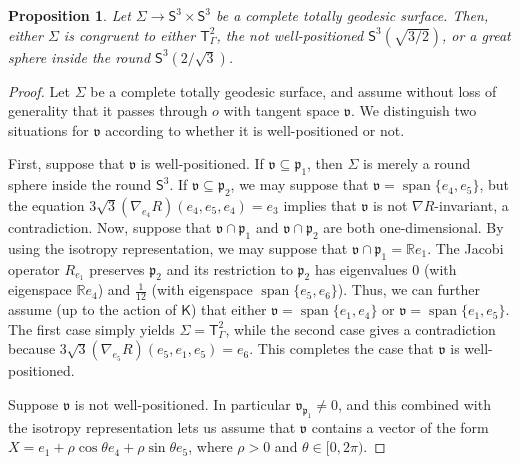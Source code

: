 \documentclass[11pt,a4paper,final]{amsart}
\newcommand{\s}{\mathsf}
\newcommand{\g}{\mathfrak}
\newcommand{\R}{\mathbb{R}}
\newcommand{\vecspan}{\operatorname{span}}
\newtheorem{proposition}[theorem]{Proposition}
\theoremstyle{definition}
\begin{document}
\begin{proposition}
	\label{prop:2tgs3s3}
	Let $\Sigma\to \mathsf{S}^{3}\times \mathsf{S}^{3}$ be a complete totally geodesic surface.
	Then, either $\Sigma$ is congruent to either $\s{T}^2_{\Gamma}$, the not well-positioned $\s{S}^{3}(\sqrt{3/2})$, or a great sphere inside the round $\s{S}^{3}\left(2/\sqrt{3}\right)$.
\end{proposition}
\begin{proof}
	Let $\Sigma$ be a complete totally geodesic surface, and assume without loss of generality that it passes through $o$ with tangent space $\g{v}$.
	We distinguish two situations for $\g{v}$ according to whether it is well-positioned or not.
		
	First, suppose that $\g{v}$ is well-positioned.
	If $\g{v}\subseteq \g{p}_{1}$, then $\Sigma$ is merely a round sphere inside the round $\mathsf{S}^{3}$.
	If $\g{v}\subseteq \g{p}_{2}$, we may suppose that $\g{v}=\vecspan\{e_{4},e_{5}\}$, but the equation $3\sqrt{3}(\nabla_{e_{4}}R)(e_{4},e_{5},e_{4})=e_{3}$ implies that $\g{v}$ is not $\nabla R$-invariant, a contradiction.
	Now, suppose that $\g{v}\cap \g{p}_{1}$ and $\g{v}\cap \g{p}_{2}$ are both one-dimensional.
	By using the isotropy representation, we may suppose that $\g{v}\cap\g{p}_{1}=\R e_{1}$.
	The Jacobi operator $R_{e_{1}}$ preserves $\g{p}_{2}$ and its restriction to $\g{p}_{2}$ has eigenvalues $0$ (with eigenspace $\R e_{4}$) and $\frac{1}{12}$ (with eigenspace $\vecspan\{e_{5},e_{6}\}$).
	Thus, we can further assume (up to the action of $\mathsf{K}$) that either $\g{v}=\vecspan\{e_{1},e_{4}\}$ or $\g{v}=\vecspan\{e_{1},e_{5}\}$.
	The first case simply yields $\Sigma=\mathsf{T}^2_{\Gamma}$, while the second case gives a contradiction because $3\sqrt{3}(\nabla_{e_{5}}R)(e_{5},e_{1},e_{5})=e_{6}$.
	This completes the case that $\g{v}$ is well-positioned.
		
	Suppose $\g{v}$ is not well-positioned.
	In particular $\g{v}_{\g{p}_{1}}\neq 0$, and this combined with the isotropy representation lets us assume that $\g{v}$ contains a vector of the form $X=e_{1}+\rho \cos \theta e_{4} + \rho \sin \theta e_{5}$, where $\rho > 0$ and $\theta\in [0,2\pi)$.
		

\end{proof}
\end{document}
